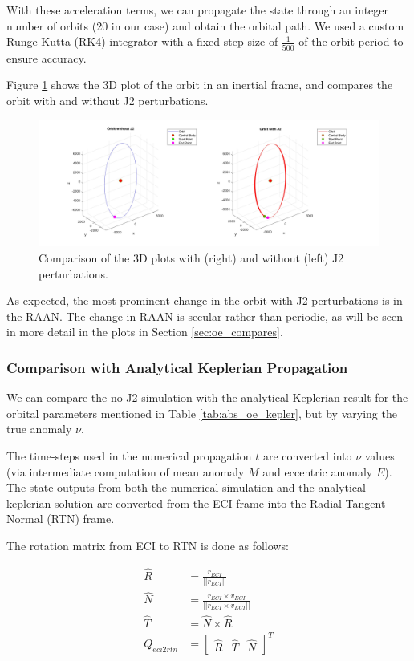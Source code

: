 With these acceleration terms, we can propagate the state through an integer number of orbits (20 in our case) and obtain the orbital path. We used a custom Runge-Kutta (RK4) integrator with a fixed step size of $\frac{1}{500}$ of the orbit period to ensure accuracy. 

Figure \ref{fig:3d_plots_with_j2} shows the 3D plot of the orbit in an inertial frame, and compares the orbit with and without J2 perturbations.

\begin{figure}[H]
    \centering
    \includegraphics[width=1.1\linewidth]{PS1/Figures/Orbit_J2_Comparison_ECI.jpg}
    \caption{Comparison of the 3D plots with (right) and without (left) J2 perturbations. }
    \label{fig:3d_plots_with_j2}
\end{figure}

As expected, the most prominent change in the orbit with J2 perturbations is in the RAAN. The change in RAAN is secular rather than periodic, as will be seen in more detail in the plots in Section \ref{sec:oe_compares}.

\subsubsection{Comparison with Analytical Keplerian Propagation}

We can compare the no-J2 simulation with the analytical Keplerian result for the orbital parameters mentioned in Table \ref{tab:abs_oe_kepler}, but by varying the true anomaly $\nu$. 

The time-steps used in the numerical propagation $t$ are converted into $\nu$ values (via intermediate computation of mean anomaly $M$ and eccentric anomaly $E$). The state outputs from both the numerical simulation and the analytical keplerian solution are converted from the ECI frame into the Radial-Tangent-Normal (RTN) frame.

The rotation matrix from ECI to RTN is done as follows:

\begin{align*}
    \hat{R} &= \frac{r_{ECI}}{||r_{ECI}||} \\
    \hat{N} &= \frac{r_{ECI} \times v_{ECI}}{||r_{ECI} \times v_{ECI}||} \\
    \hat{T} &= \hat{N} \times \hat{R} \\
    Q_{eci2rtn} &= \begin{bmatrix}
        \hat{R} & \hat{T} & \hat{N}
    \end{bmatrix}^T \\
\end{align*}

